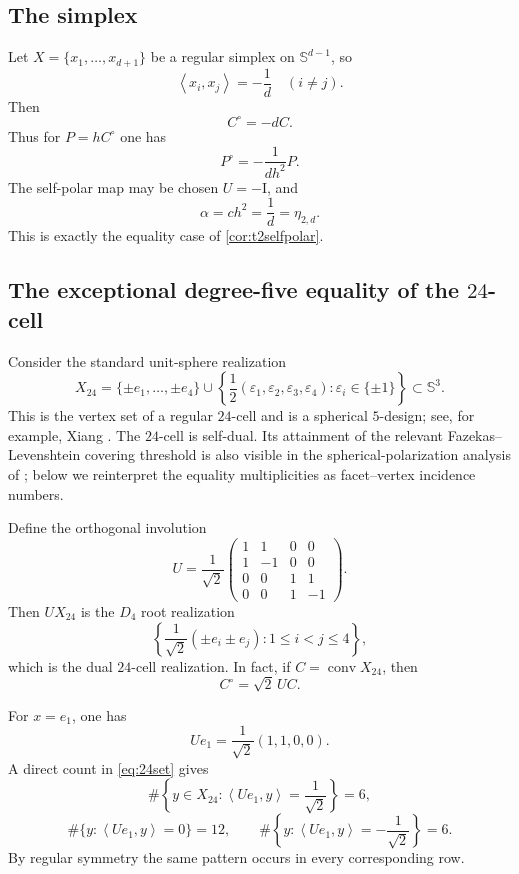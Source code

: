 \documentclass[11pt]{amsart}
\theoremstyle{definition}
\theoremstyle{remark}
\newcommand{\Sph}{\mathbb S}
\newcommand{\Id}{\mathrm I}
\newcommand{\conv}{\operatorname{conv}}
\newcommand{\ip}[2]{\left\langle #1,#2\right\rangle}
\begin{document}
\subsection{The simplex}

Let $X=\{x_1,\ldots,x_{d+1}\}$ be a regular simplex on $\Sph^{d-1}$, so
\[
 \ip{x_i}{x_j}=-\frac1d\quad(i\ne j).
\]
Then
\[
 C^\circ=-dC.
\]
Thus for $P=hC^\circ$ one has
\[
 P^\circ=-\frac1{d h^2}P.
\]
The self-polar map may be chosen $U=-\Id$, and
\[
 \alpha=ch^2=\frac1d=\eta_{2,d}.
\]
This is exactly the equality case of \cref{cor:t2selfpolar}.

\subsection{The exceptional degree-five equality of the $24$-cell}

Consider the standard unit-sphere realization
\begin{equation}\label{eq:24set}
 X_{24}
 =\{\pm e_1,\ldots,\pm e_4\}
 \cup
 \left\{\frac12(\varepsilon_1,\varepsilon_2,\varepsilon_3,\varepsilon_4):
 \varepsilon_i\in\{\pm1\}\right\}
 \subset\Sph^3.
\end{equation}
This is the vertex set of a regular $24$-cell and is a spherical $5$-design; see, for example, Xiang \cite{Xiang2022}.  The $24$-cell is self-dual.  Its attainment of the relevant Fazekas--Levenshtein covering threshold is also visible in the spherical-polarization analysis of \cite{BoyvalenkovEtAl2023}; below we reinterpret the equality multiplicities as facet--vertex incidence numbers.

Define the orthogonal involution
\begin{equation}\label{eq:U24}
 U=\frac1{\sqrt2}
 \begin{pmatrix}
 1&1&0&0\\
 1&-1&0&0\\
 0&0&1&1\\
 0&0&1&-1
 \end{pmatrix}.
\end{equation}
Then $UX_{24}$ is the $D_4$ root realization
\[
 \left\{\frac1{\sqrt2}(\pm e_i\pm e_j):1\le i<j\le4\right\},
\]
which is the dual $24$-cell realization.  In fact, if $C=\conv X_{24}$, then
\begin{equation}\label{eq:24dual}
 C^\circ=\sqrt2\,UC.
\end{equation}

For $x=e_1$, one has
\[
 Ue_1=\frac1{\sqrt2}(1,1,0,0).
\]
A direct count in \eqref{eq:24set} gives
\begin{equation}\label{eq:24distribution}
 \#\left\{y\in X_{24}:\ip{Ue_1}{y}=\frac1{\sqrt2}\right\}=6,
\end{equation}
\[
 \#\{y:\ip{Ue_1}{y}=0\}=12,
 \qquad
 \#\left\{y:\ip{Ue_1}{y}=-\frac1{\sqrt2}\right\}=6.
\]
By regular symmetry the same pattern occurs in every corresponding row.
\end{document}
